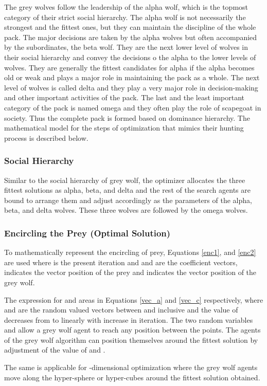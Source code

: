 \documentclass{llncs}
\begin{document}
The grey wolves follow the leadership of the alpha wolf, which is the topmost category of their strict social hierarchy. The alpha wolf is not necessarily the strongest and the fittest ones, but they can maintain the discipline of the whole pack. The major decisions are taken by the alpha wolves but often accompanied by the subordinates, the beta wolf. They are the next lower level of wolves in their social hierarchy and convey the decisions o the alpha to the lower levels of wolves. They are generally the fittest candidates for alpha if the alpha becomes old or weak and plays a major role in maintaining the pack as a whole. The next level of wolves is called delta and they play a very major role in decision-making and other important activities of the pack. The last and the least important category of the pack is named omega and they often play the role of scapegoat in society. Thus the complete pack is formed based on dominance hierarchy. The mathematical model for the steps of optimization that mimics their hunting process is described below.
\subsubsection{Social Hierarchy}
Similar to the social hierarchy of grey wolf, the optimizer allocates the three fittest solutions as alpha, beta, and delta and the rest of the search agents are bound to arrange them and adjust accordingly as the parameters of the alpha, beta, and delta wolves. These three wolves are followed by the omega wolves.
\subsubsection{Encircling the Prey (Optimal Solution)}
To mathematically represent the encircling of prey, Equations \ref{enc1}, and \ref{enc2} are used where  is the present iteration and  and  are the coefficient vectors,  indicates the vector position of the prey and  indicates the vector position of the grey wolf.


The expression for  and  areas in Equations \ref{vec_a} and \ref{vec_c} respectively, where  and  are the random valued vectors between  and  inclusive and the value of  decreases from  to  linearly with increase in iteration. The two random variables  and  allow a grey wolf agent to reach any position between the points. The agents of the grey wolf algorithm can position themselves around the fittest solution by adjustment of the value of  and . 


The same is applicable for -dimensional optimization where the grey wolf agents move along the hyper-sphere or hyper-cubes around the fittest solution obtained.
\end{document}

